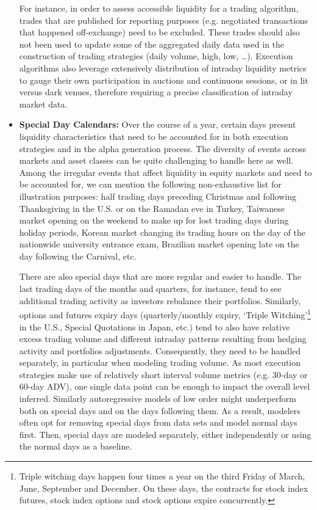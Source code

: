 \begin{itemize}
For instance, in order to assess accessible liquidity for a trading algorithm, trades that are published for reporting purposes (e.g. negotiated transactions that happened off-exchange) need to be excluded. These trades should also not been used to update some of the aggregated daily data used in the construction of trading strategies (daily volume, high, low, \dots). Execution algorithms also leverage extensively distribution of intraday liquidity metrics to gauge their own participation in auctions and continuous sessions, or in lit versus dark venues, therefore requiring a precise classification of intraday market data. 


\item \textbf{Special Day Calendars:} Over the course of a year, certain days present liquidity characteristics that need to be accounted for in both execution strategies and in the alpha generation process. The diversity of events across markets and asset classes can be quite challenging to handle here as well. Among the irregular events that affect liquidity in equity markets and need to be accounted for, we can mention the following non-exhaustive list for illustration purposes: half trading days preceding Christmas and following Thanksgiving in the U.S. or on the Ramadan eve in Turkey, Taiwanese market opening on the weekend to make up for lost trading days during holiday periods, Korean market changing its trading hours on the day of the nationwide university entrance exam, Brazilian market opening late on the day following the Carnival, etc.


There are also special days that are more regular and easier to handle. The last trading days of the months and quarters, for instance, tend to see additional trading activity as investors rebalance their portfolios. Similarly, options and futures expiry days (quarterly/monthly expiry, `Triple Witching'\footnote{Triple witching days happen four times a year on the third Friday of March, June, September and December. On these days, the contracts for stock index futures, stock index options and stock options expire concurrently.} in the U.S., Special Quotations in Japan, etc.) tend to also have relative excess trading volume and different intraday patterns resulting from hedging activity and portfolios adjustments. Consequently, they need to be handled separately, in particular when modeling trading volume. As most execution strategies make use of relatively short interval volume metrics (e.g. 30-day or 60-day ADV), one single data point can be enough to impact the overall level inferred. Similarly autoregressive models of low order might underperform both on special days and on the days following them. As a result, modelers often opt for removing special days from data sets and model normal days first. Then, special days are modeled separately, either independently or using the normal days as a baseline. 



\end{itemize}

